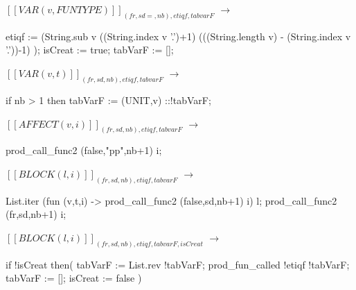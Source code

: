 \documentclass[a4paper, 11pt]{report}
\begin{document}
$[\![ VAR(v,FUNTYPE) ]\!]
_{(fr,sd=,nb),etiqf,tabvarF} $
$\longrightarrow$
\begin{OCaml}
  etiqf := (String.sub v ((String.index v '.')+1) (((String.length v) - (String.index v '.'))-1) );
  isCreat := true;
  tabVarF := [];
\end{OCaml}

$[\![ VAR(v,t) ]\!]
_{(fr,sd,nb),etiqf,tabvarF} $
$\longrightarrow$
\begin{OCaml}
  if nb > 1 then
  tabVarF := (UNIT,v) ::!tabVarF;
\end{OCaml}

$[\![ AFFECT(v,i) ]\!]
_{(fr,sd,nb),etiqf,tabvarF} $
$\longrightarrow$
\begin{OCaml}
 prod\_call\_func2 (false,"pp",nb+1) i;
\end{OCaml}

$[\![ BLOCK(l,i) ]\!]
_{(fr,sd,nb),etiqf,tabvarF} $
$\longrightarrow$
\begin{OCaml}
  List.iter (fun (v,t,i) -> prod\_call\_func2 (false,sd,nb+1) i) l;
  prod\_call\_func2 (fr,sd,nb+1) i;
\end{OCaml}

$[\![ BLOCK(l,i) ]\!]
_{(fr,sd,nb),etiqf,tabvarF,isCreat} $
$\longrightarrow$
\begin{OCaml}
  if !isCreat then(
  tabVarF := List.rev !tabVarF;
  prod\_fun\_called !etiqf !tabVarF;
  tabVarF := [];
  isCreat := false
  )
\end{OCaml} 
\end{document}
